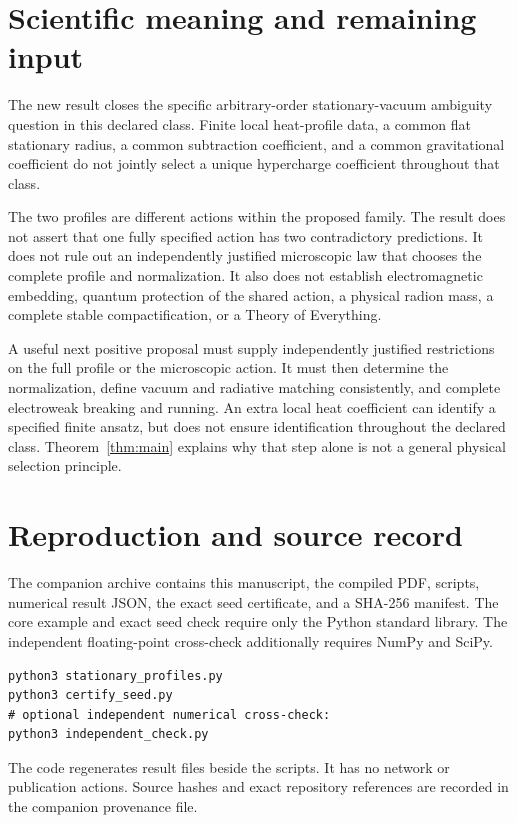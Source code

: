 \documentclass[11pt,letterpaper]{article}
\begin{document}
\section{Scientific meaning and remaining input}

The new result closes the specific arbitrary-order stationary-vacuum ambiguity question in this declared class. Finite local heat-profile data, a common flat stationary radius, a common subtraction coefficient, and a common gravitational coefficient do not jointly select a unique hypercharge coefficient throughout that class.

The two profiles are different actions within the proposed family. The result does not assert that one fully specified action has two contradictory predictions. It does not rule out an independently justified microscopic law that chooses the complete profile and normalization. It also does not establish electromagnetic embedding, quantum protection of the shared action, a physical radion mass, a complete stable compactification, or a Theory of Everything.

A useful next positive proposal must supply independently justified restrictions on the full profile or the microscopic action. It must then determine the normalization, define vacuum and radiative matching consistently, and complete electroweak breaking and running. An extra local heat coefficient can identify a specified finite ansatz, but does not ensure identification throughout the declared class. Theorem~\ref{thm:main} explains why that step alone is not a general physical selection principle.

\section{Reproduction and source record}

The companion archive contains this manuscript, the compiled PDF, scripts, numerical result JSON, the exact seed certificate, and a SHA-256 manifest. The core example and exact seed check require only the Python standard library. The independent floating-point cross-check additionally requires NumPy and SciPy.

\begin{verbatim}
python3 stationary_profiles.py
python3 certify_seed.py
# optional independent numerical cross-check:
python3 independent_check.py
\end{verbatim}

The code regenerates result files beside the scripts. It has no network or publication actions. Source hashes and exact repository references are recorded in the companion provenance file.
\end{document}
